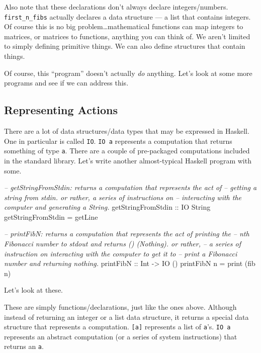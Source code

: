 \documentclass[]{article}
\newenvironment{Shaded}{}{}
\newcommand{\CommentTok}[1]{\textcolor[rgb]{0.38,0.63,0.69}{\textit{#1}}}
\newcommand{\DataTypeTok}[1]{\textcolor[rgb]{0.56,0.13,0.00}{#1}}
\newcommand{\FunctionTok}[1]{\textcolor[rgb]{0.02,0.16,0.49}{#1}}
\newcommand{\NormalTok}[1]{#1}
\newcommand{\OtherTok}[1]{\textcolor[rgb]{0.00,0.44,0.13}{#1}}
\begin{document}
Also note that these declarations don't always declare integers/numbers.
\texttt{first\_n\_fibs} actually declares a data structure --- a list that
contains integers. Of course this is no big problem\ldots{}mathematical
functions can map integers to matrices, or matrices to functions, anything you
can think of. We aren't limited to simply defining primitive things. We can also
define structures that contain things.

Of course, this ``program'' doesn't actually \emph{do} anything. Let's look at
some more programs and see if we can address this.

\hypertarget{representing-actions}{%
\subsection{Representing Actions}\label{representing-actions}}

There are a lot of data structures/data types that may be expressed in Haskell.
One in particular is called \texttt{IO}. \texttt{IO\ a} represents a computation
that returns something of type \texttt{a}. There are a couple of pre-packaged
computations included in the standard library. Let's write another
almost-typical Haskell program with some.

\begin{Shaded}
\begin{Highlighting}[]
\CommentTok{--  getStringFromStdin: returns a computation that represents the act of}
\CommentTok{--      getting a string from stdin.  or rather, a series of instructions on}
\CommentTok{--      interacting with the computer and generating a String.}
\OtherTok{getStringFromStdin ::} \DataTypeTok{IO} \DataTypeTok{String}
\NormalTok{getStringFromStdin }\FunctionTok{=}\NormalTok{ getLine}

\CommentTok{--  printFibN: returns a computation that represents the act of printing the}
\CommentTok{--      nth Fibonacci number to stdout and returns () (Nothing).  or rather,}
\CommentTok{--      a series of instruction on interacting with the computer to get it to}
\CommentTok{--      print a Fibonacci number and returning nothing.}
\OtherTok{printFibN ::} \DataTypeTok{Int} \OtherTok{->} \DataTypeTok{IO}\NormalTok{ ()}
\NormalTok{printFibN n }\FunctionTok{=}\NormalTok{ print (fib n)}
\end{Highlighting}
\end{Shaded}

Let's look at these.

These are simply functions/declarations, just like the ones above. Although
instead of returning an integer or a list data structure, it returns a special
data structure that represents a computation. \texttt{{[}a{]}} represents a list
of \texttt{a}'s. \texttt{IO\ a} represents an abstract computation (or a series
of system instructions) that returns an \texttt{a}.
\end{document}
